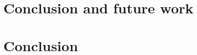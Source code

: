 \documentclass[12pt]{ociamthesis}\usepackage[]{graphicx}\usepackage[]{color}
\begin{document}
\lipsum

\chapter{Conclusion and future work}

\lipsum

\chapter{Conclusion}


% 
\renewcommand{\bibname}{References}
\printbibliography
\end{document}
